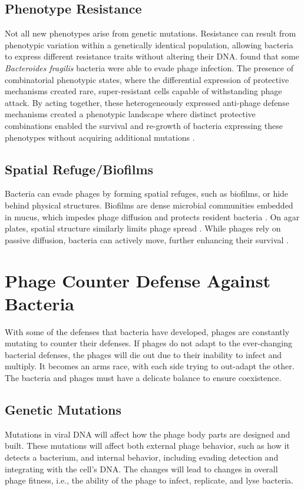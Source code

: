 \subsection{Phenotype Resistance}
Not all new phenotypes arise from genetic mutations. 
Resistance can result from phenotypic variation within a genetically identical population, allowing bacteria to express different resistance traits without altering their DNA.
\citet{guptaCombinatorialPhenotypicLandscape2025} found that some \textit{Bacteroides fragilis} bacteria were able to evade phage infection.  
The presence of combinatorial phenotypic states, where the differential expression of protective mechanisms created rare, super-resistant cells capable of withstanding phage attack.
By acting together, these heterogeneously expressed anti-phage defense mechanisms created a phenotypic landscape where distinct protective combinations enabled the survival and re-growth of bacteria expressing these phenotypes without acquiring additional mutations \cite{guptaCombinatorialPhenotypicLandscape2025}. 

\subsection{Spatial Refuge/Biofilms} 
Bacteria can evade phages by forming spatial refuges, such as biofilms, or hide behind physical structures. 
Biofilms are dense microbial communities embedded in mucus, which impedes phage diffusion and protects resident bacteria \cite{abedonPhageDelayEnhancing2017}. 
On agar plates, spatial structure similarly limits phage spread \cite{eriksenGrowingMicrocolonyCan2018}. 
While phages rely on passive diffusion, bacteria can actively move, further enhancing their survival \cite{lohrmannInfluenceBacterialSwimming2024}.

\section{Phage Counter Defense Against Bacteria}
With some of the defenses that bacteria have developed, phages are constantly mutating to counter their defenses. 
If phages do not adapt to the ever-changing bacterial defenses, the phages will die out due to their inability to infect and multiply. 
It becomes an arms race, with each side trying to out-adapt the other. 
The bacteria and phages must have a delicate balance to ensure coexistence. 

\subsection{Genetic Mutations}
Mutations in viral DNA will affect how the phage body parts are designed and built. 
These mutations will affect both external phage behavior, such as how it detects a bacterium, and internal behavior, including evading detection and integrating with the cell's DNA. 
The changes will lead to changes in overall phage fitness, i.e., the ability of the phage to infect, replicate, and lyse bacteria. 


